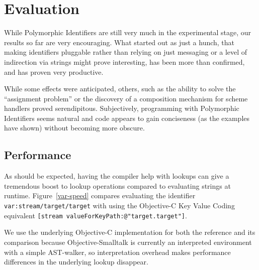 \documentclass[preprint,authoryear]{llncs}
\begin{document}

\section{Evaluation}
\label{evaluation}

While Polymorphic Identifiers are still very much in the experimental stage, our
results so far are very encouraging.  What started out as just a hunch, that making
identifiers pluggable rather than relying on just messaging or a level of indirection
via strings might prove interesting, has been more than confirmed, and has proven
very productive.

While some effects were anticipated, others, such as the ability to solve the
``assignment problem'' or the discovery of a composition mechanism for
scheme handlers proved serendipitous.  Subjectively, programming with Polymorphic
Identifiers seems natural and code appears to gain conciseness (as the examples
have shown) without becoming more obscure.


\subsection{Performance}

As should be expected, having the compiler help with lookups can give a tremendous
boost to lookup operations compared to evaluating strings at runtime.  Figure~\ref{var-speed} 
compares evaluating the identifier {\tt var:stream/target/target} with using the Objective-C 
Key Value Coding equivalent {\tt [stream valueForKeyPath:@"target.target"]}.

We use the underlying Objective-C implementation for both the reference and its 
comparison because Objective-Smalltalk is currently an interpreted environment with
a simple AST-walker, so interpretation overhead makes performance differences in
the underlying lookup disappear.
\end{document}
